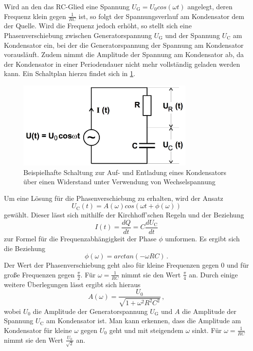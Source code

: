 Wird an den das RC-Glied eine Spannung $U_{\text{G}}=U_{\text{0}}cos(\omega t)$ angelegt, deren
Frequenz klein gegen $\frac{1}{RC}$ ist, so folgt der Spannungsverlauf am Kondensator
dem der Quelle. Wird die Frequenz jedoch erhöht, so stellt sich eine Phasenverschiebung
zwischen Generatorspannung $U_{\text{G}}$ und der Spannung $U_{\text{C}}$ am Kondensator
ein, bei der die Generatorspannung der Spannung am Kondensator vorausläuft.
Zudem nimmt die Amplitude der Spannung am Kondensator ab, da der Kondensator in einer
Periodendauer nicht mehr vollständig geladen werden kann. Ein Schaltplan hierzu findet
sich in \ref{fig:Aufbau_2}.
\begin{figure}
  \centering
  \includegraphics[width=250pt]{aufbau_2.png}
  \caption{Beispielhafte Schaltung zur Auf- und Entladung eines Kondensators über
  einen Widerstand unter Verwendung von Wechselspannung \cite{Versuchsanleitung}}
  \label{fig:Aufbau_2}
\end{figure}


Um eine Lösung für die Phasenverschiebung zu erhalten, wird der Ansatz
\begin{equation}
  U_{\text{C}}(t)=A(\omega)cos(\omega t + \phi(\omega))
\end{equation}
gewählt. Dieser lässt sich mithilfe der Kirchhoff'schen Regeln und der Beziehung
\begin{equation}
  I(t)=\frac{dQ}{dt}=C\frac{dU_{\text{C}}}{dt}
\end{equation}
zur Formel für die Frequenzabhängigkeit der Phase $\phi$ umformen. Es ergibt sich die
Beziehung
\begin{equation}
  \phi(\omega)=arctan(-\omega R C) \,.
\end{equation}
Der Wert der Phasenverschiebung geht also für kleine Frequenzen gegen $0$ und für
große Frequenzen gegen $\frac{\pi}{2}$. Für $\omega=\frac{1}{RC}$ nimmt sie den Wert
$\frac{\pi}{4}$ an.
Durch einige weitere Überlegungen lässt ergibt sich hieraus
\begin{equation}
  A(\omega)=\frac{U_{\text{0}}}{\sqrt{1+\omega^2 R^2 C^2}} \,,
\end{equation}
wobei $U_{\text{0}}$ die Amplitude der Generatorspannung $U_{\text{G}}$ und $A$ die
Amplitude der Spannung $U_{\text{C}}$ am Kondensator ist.
Man kann erkennen, dass die Amplitude am Kondensator für kleine $\omega$ gegen $U_{\text{0}}$ geht
und mit steigendem $\omega$ sinkt. Für $\omega=\frac{1}{RC}$ nimmt sie den Wert
$\frac{U_{\text{0}}}{\sqrt{2}}$ an.

